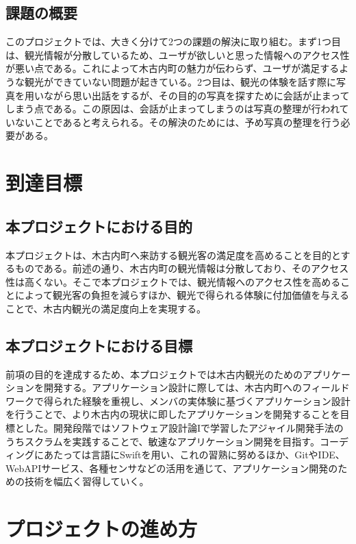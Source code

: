 \documentclass[openany,11pt,papersize]{jsbook}
\begin{document}
\section{課題の概要}\label{sec:gaiyou}
このプロジェクトでは、大きく分けて2つの課題の解決に取り組む。まず1つ目は、観光情報が分散しているため、ユーザが欲しいと思った情報へのアクセス性が悪い点である。これによって木古内町の魅力が伝わらず、ユーザが満足するような観光ができていない問題が起きている。2つ目は、観光の体験を話す際に写真を用いながら思い出話をするが、その目的の写真を探すために会話が止まってしまう点である。この原因は、会話が止まってしまうのは写真の整理が行われていないことであると考えられる。その解決のためには、予め写真の整理を行う必要がある。


\chapter{到達目標}
\section{本プロジェクトにおける目的}
本プロジェクトは、木古内町へ来訪する観光客の満足度を高めることを目的とするものである。前述の通り、木古内町の観光情報は分散しており、そのアクセス性は高くない。そこで本プロジェクトでは、観光情報へのアクセス性を高めることによって観光客の負担を減らすほか、観光で得られる体験に付加価値を与えることで、木古内観光の満足度向上を実現する。

\section{本プロジェクトにおける目標}
前項の目的を達成するため、本プロジェクトでは木古内観光のためのアプリケーションを開発する。アプリケーション設計に際しては、木古内町へのフィールドワークで得られた経験を重視し、メンバの実体験に基づくアプリケーション設計を行うことで、より木古内の現状に即したアプリケーションを開発することを目標とした。開発段階ではソフトウェア設計論Iで学習したアジャイル開発手法のうちスクラムを実践することで、敏速なアプリケーション開発を目指す。コーディングにあたっては言語にSwiftを用い、これの習熟に努めるほか、GitやIDE、WebAPIサービス、各種センサなどの活用を通じて、アプリケーション開発のための技術を幅広く習得していく。

\chapter{プロジェクトの進め方}
\end{document}
